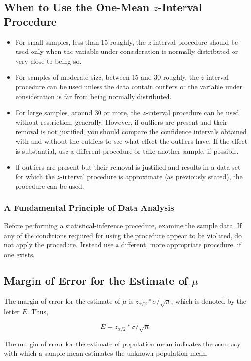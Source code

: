 \documentclass[12pt]{article}
\begin{document}
        \subsection*{When to Use the One-Mean $z$-Interval Procedure}
            \begin{itemize}
                \item For small samples, less than 15 roughly, the $z$-interval procedure should
                be used only when the variable under consideration is normally distributed or 
                very close to being so.
                \item For samples of moderate size, between 15 and 30 roughly, the $z$-interval
                procedure can be used unless the data contain outliers or the variable under
                consideration is far from being normally distributed.
                \item For large samples, around 30 or more, the $z$-interval procedure can be
                used without restriction, generally. However, if outliers are present and their
                removal is not justified, you should compare the confidence intervals obtained 
                with and without the outliers to see what effect the outliers have. If the effect
                is substantial, use a different procedure or take another sample, if possible.                   
                \item If outliers are present but their removal is justified and results in a
                data set for which the $z$-interval procedure is approximate (as previously 
                stated), the procedure can be used.
            \end{itemize}
            \subsubsection*{A Fundamental Principle of Data Analysis}
                Before performing a statistical-inference procedure, examine the sample data. If
                any of the conditions required for using the procedure appear to be violated, do
                not apply the procedure. Instead use a different, more appropriate procedure, if
                one exists.
        \subsection*{Margin of Error for the Estimate of $\mu$}
            The margin of error for the estimate of $\mu$ is $z_{\alpha/2}*\sigma/\sqrt{n}$,
            which is denoted by the letter $E$. Thus,
            \begin{center}
                \[
                    E = z_{\alpha/2}*\sigma/\sqrt{n}.    
                \]                
            \end{center}
            The margin of error for the estimate of population mean indicates the accuracy with
            which a sample mean estimates the unknown population mean. 
\end{document}

